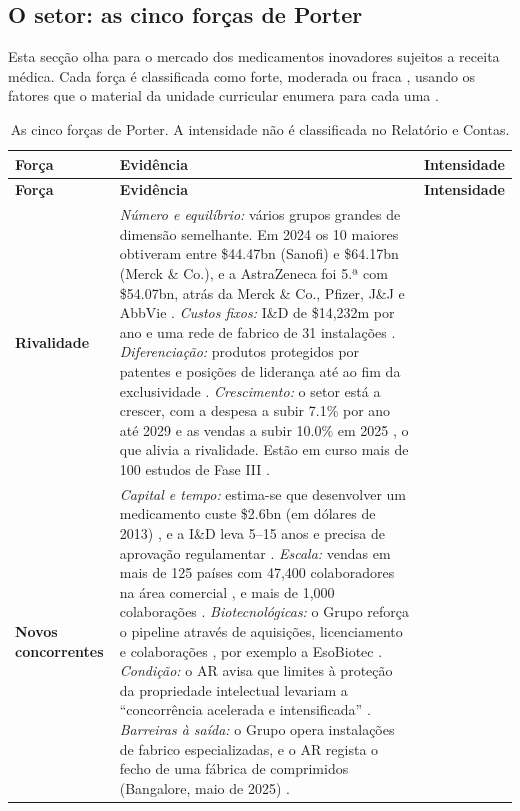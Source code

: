 \subsection{O setor: as cinco forças de Porter}
Esta secção olha para o mercado dos medicamentos inovadores sujeitos a receita médica. Cada força é classificada como forte, moderada ou fraca \cite[p.~21]{PLAN}, usando os fatores que o material da unidade curricular enumera para cada uma \cite[pp.~22--24]{PLAN}.


\begin{xltabular}{\linewidth}{@{}N{2.5cm}Yp{2.3cm}@{}}
\caption{As cinco forças de Porter. A intensidade não é classificada no Relatório e Contas.}\label{tab:porter}\\*
\toprule
\textbf{Força} & \textbf{Evidência} & \textbf{Intensidade} \\*
\midrule
\endfirsthead
\toprule
\textbf{Força} & \textbf{Evidência} & \textbf{Intensidade} \\*
\midrule
\endhead
\bottomrule
\endfoot
\textbf{Rivalidade} & \textit{Número e equilíbrio:} vários grupos grandes de dimensão semelhante. Em 2024 os 10 maiores obtiveram entre \$44.47bn (Sanofi) e \$64.17bn (Merck \& Co.), e a AstraZeneca foi 5.ª com \$54.07bn, atrás da Merck \& Co., Pfizer, J\&J e AbbVie \cite{P50}. \textit{Custos fixos:} I\&D de \$14,232m por ano \cite[p.~55]{AR} e uma rede de fabrico de 31 instalações \cite[p.~33]{AR}. \textit{Diferenciação:} produtos protegidos por patentes e posições de liderança até ao fim da exclusividade \cite[pp.~9, 56]{AR}. \textit{Crescimento:} o setor está a crescer, com a despesa a subir 7.1\% por ano até 2029 e as vendas a subir 10.0\% em 2025 \cite[p.~6]{AR}, o que alivia a rivalidade. Estão em curso mais de 100 estudos de Fase III \cite[p.~3]{AR}. &  \\
\textbf{Novos concorrentes} & \textit{Capital e tempo:} estima-se que desenvolver um medicamento custe \$2.6bn (em dólares de 2013) \cite{MULLARD}, e a I\&D leva 5--15 anos e precisa de aprovação regulamentar \cite[p.~9]{AR}. \textit{Escala:} vendas em mais de 125 países com 47,400 colaboradores na área comercial \cite[p.~32]{AR}, e mais de 1,000 colaborações \cite[p.~37]{AR}. \textit{Biotecnológicas:} o Grupo reforça o pipeline através de aquisições, licenciamento e colaborações \cite[p.~48]{AR}, por exemplo a EsoBiotec \cite[p.~37]{AR}. \textit{Condição:} o AR avisa que limites à proteção da propriedade intelectual levariam a ``concorrência acelerada e intensificada'' \cite[p.~49]{AR}. \textit{Barreiras à saída:} o Grupo opera instalações de fabrico especializadas, e o AR regista o fecho de uma fábrica de comprimidos (Bangalore, maio de 2025) \cite[p.~33]{AR}. &  \\

\end{xltabular}
